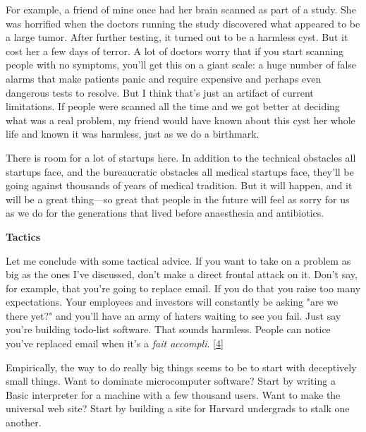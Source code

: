 For
                  example, a friend of mine once had her brain scanned as part
                  of a study. She was horrified when the doctors running the
                  study discovered what appeared to be a large tumor. After
                  further testing, it turned out to be a harmless cyst. But it
                  cost her a few days of terror. A lot of doctors worry that if
                  you start scanning people with no symptoms, you'll get this on
                  a giant scale: a huge number of false alarms that make
                  patients panic and require expensive and perhaps even
                  dangerous tests to resolve. But I think that's just an
                  artifact of current limitations. If people were scanned all
                  the time and we got better at deciding what was a real
                  problem, my friend would have known about this cyst her whole
                  life and known it was harmless, just as we do a birthmark.

There
                  is room for a lot of startups here. In addition to the
                  technical obstacles all startups face, and the bureaucratic
                  obstacles all medical startups face, they'll be going against
                  thousands of years of medical tradition. But it will happen,
                  and it will be a great thing---so great that people in the
                  future will feel as sorry for us as we do for the generations
                  that lived before anaesthesia and antibiotics.

\textbf{Tactics}

Let me conclude with some tactical advice. If you
                  want to take on a problem as big as the ones I've discussed,
                  don't make a direct frontal attack on it. Don't say, for
                  example, that you're going to replace email. If you do that
                  you raise too many expectations. Your employees and investors
                  will constantly be asking "are we there yet?" and you'll have
                  an army of haters waiting to see you fail. Just say you're
                  building todo-list software. That sounds harmless. People can
                  notice you've replaced email when it's a \emph{fait accompli}.
                  [\href{\#f4n}{4}]

Empirically, the way to do really big things
                  seems to be to start with deceptively small things. Want to
                  dominate microcomputer software? Start by writing a Basic
                  interpreter for a machine with a few thousand users. Want to
                  make the universal web site? Start by building a site for
                  Harvard undergrads to stalk one another.

